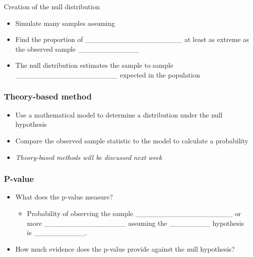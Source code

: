\documentclass[
]{report}
\providecommand{\tightlist}{%
  \setlength{\itemsep}{0pt}\setlength{\parskip}{0pt}}
\begin{document}

Creation of the null distribution

\begin{itemize}
\tightlist
\item
  Simulate many samples assuming
\end{itemize}

\vspace{0.2in}

\begin{itemize}
\item
  Find the proportion of \_\_\_\_\_\_\_\_\_\_\_\_\_\_\_\_\_\_\_ at least as extreme as the observed sample \_\_\_\_\_\_\_\_\_\_\_\_
\item
  The null distribution estimates the sample to sample \_\_\_\_\_\_\_\_\_\_\_\_\_\_\_\_\_\_\_\_ expected in the population
\end{itemize}


\hypertarget{theory-based-method}{%
\subsubsection*{Theory-based method}\label{theory-based-method}}

\begin{itemize}
\item
  Use a mathematical model to determine a distribution under the null hypothesis
\item
  Compare the observed sample statistic to the model to calculate a probability
\item
  \emph{Theory-based methods will be discussed next week}
\end{itemize}

\hypertarget{p-value}{%
\subsubsection*{P-value}\label{p-value}}


\begin{itemize}
\item
  What does the p-value measure?

  \begin{itemize}
  \tightlist
  \item
    Probability of observing the sample \_\_\_\_\_\_\_\_\_\_\_\_\_\_\_\_\_\_\_ or more \_\_\_\_\_\_\_\_\_\_\_\_\_\_\_\_
    assuming the \_\_\_\_\_\_\_\_ hypothesis is \_\_\_\_\_\_\_\_\_\_.
  \end{itemize}
\item
  How much evidence does the p-value provide against the null hypothesis?
\end{itemize}
\end{document}
